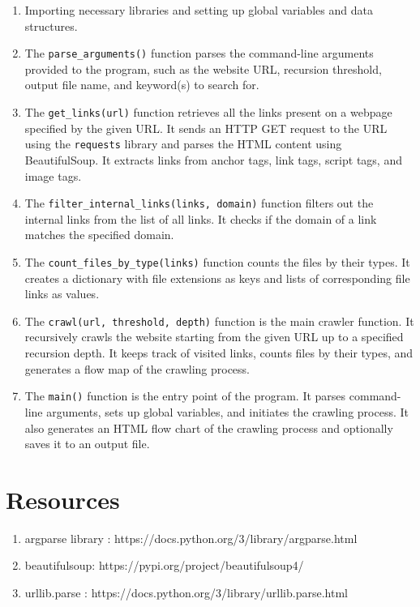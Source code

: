 \documentclass{article}
\begin{document}
\begin{enumerate}
    \item Importing necessary libraries and setting up global variables and data structures.
    
    \item The \texttt{parse\_arguments()} function parses the command-line arguments provided to the program, such as the website URL, recursion threshold, output file name, and keyword(s) to search for.
    
    \item The \texttt{get\_links(url)} function retrieves all the links present on a webpage specified by the given URL. It sends an HTTP GET request to the URL using the \texttt{requests} library and parses the HTML content using BeautifulSoup. It extracts links from anchor tags, link tags, script tags, and image tags.
    
    \item The \texttt{filter\_internal\_links(links, domain)} function filters out the internal links from the list of all links. It checks if the domain of a link matches the specified domain.
    
    \item The \texttt{count\_files\_by\_type(links)} function counts the files by their types. It creates a dictionary with file extensions as keys and lists of corresponding file links as values.
    
    \item The \texttt{crawl(url, threshold, depth)} function is the main crawler function. It recursively crawls the website starting from the given URL up to a specified recursion depth. It keeps track of visited links, counts files by their types, and generates a flow map of the crawling process.
    
    \item The \texttt{main()} function is the entry point of the program. It parses command-line arguments, sets up global variables, and initiates the crawling process. It also generates an HTML flow chart of the crawling process and optionally saves it to an output file.
\end{enumerate}

\vspace{10cm}
\section{Resources}
\begin{enumerate}
    \item argparse library : https://docs.python.org/3/library/argparse.html
    \item beautifulsoup: https://pypi.org/project/beautifulsoup4/
    \item urllib.parse : https://docs.python.org/3/library/urllib.parse.html
\end{enumerate}
\end{document}
